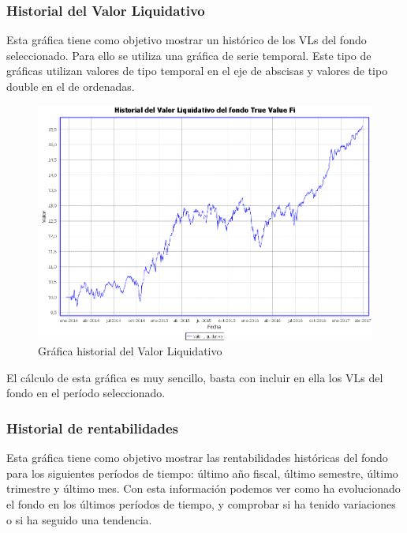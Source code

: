 \documentclass[12pt, a4paper]{article}
\begin{document}
\subsubsection{Historial del Valor Liquidativo}

Esta gráfica tiene como objetivo mostrar un histórico de los \gls{VL}s del fondo seleccionado. Para ello se utiliza una gráfica de serie temporal. Este tipo de gráficas utilizan valores de tipo temporal en el eje de abscisas y valores de tipo double en el de ordenadas.\\

	\begin{figure}[htbp]
	\centering
	\includegraphics[width=\textwidth]{figuras/historial.PNG}
	\caption{Gráfica historial del Valor Liquidativo}
	\label{fig:historial}
	\end {figure}

El cálculo de esta gráfica es muy sencillo, basta con incluir en ella los \gls{VL}s del fondo en el período seleccionado.

\newpage

\subsubsection{Historial de rentabilidades}

Esta gráfica tiene como objetivo mostrar las rentabilidades históricas del fondo para los siguientes períodos de tiempo: último año fiscal, último semestre, último trimestre y último mes. Con esta información podemos ver como ha evolucionado el fondo en los últimos períodos de tiempo, y comprobar si ha tenido variaciones o si ha seguido una tendencia.\\
\end{document}
